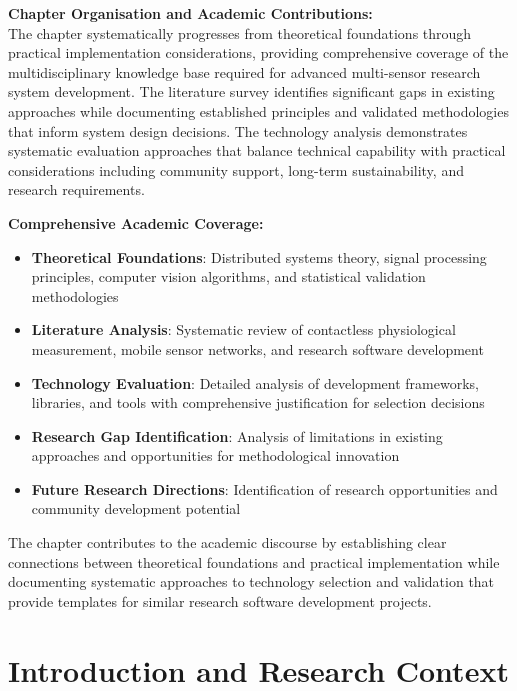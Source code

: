 \documentclass[11pt,a4paper]{report}
\begin{document}
\noindent \textbf{Chapter Organisation and Academic Contributions:}\\

The chapter systematically progresses from theoretical foundations through practical implementation considerations, providing comprehensive coverage of the multidisciplinary knowledge base required for advanced multi-sensor research system development. The literature survey identifies significant gaps in existing approaches while documenting established principles and validated methodologies that inform system design decisions. The technology analysis demonstrates systematic evaluation approaches that balance technical capability with practical considerations including community support, long-term sustainability, and research requirements.

\noindent \textbf{Comprehensive Academic Coverage:}\\
\begin{itemize}
\item \textbf{Theoretical Foundations}: Distributed systems theory, signal processing principles, computer vision algorithms, and statistical validation methodologies
\item \textbf{Literature Analysis}: Systematic review of contactless physiological measurement, mobile sensor networks, and research software development
\item \textbf{Technology Evaluation}: Detailed analysis of development frameworks, libraries, and tools with comprehensive justification for selection decisions
\item \textbf{Research Gap Identification}: Analysis of limitations in existing approaches and opportunities for methodological innovation
\item \textbf{Future Research Directions}: Identification of research opportunities and community development potential
\end{itemize}

The chapter contributes to the academic discourse by establishing clear connections between theoretical foundations and practical implementation while documenting systematic approaches to technology selection and validation that provide templates for similar research software development projects.

\section{Introduction and Research Context}
\end{document}
